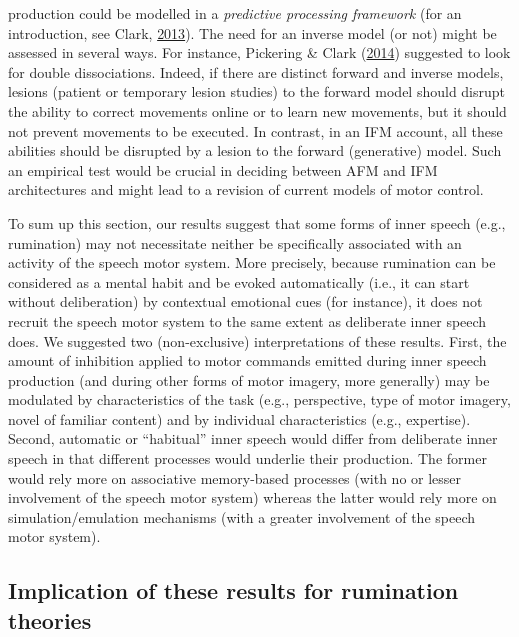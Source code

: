 \documentclass[a4paper,12pt,twoside,onecolumn,openright,final,oldfontcommands]{memoir}
\begin{document}
production could be modelled in a \emph{predictive processing framework} (for an introduction, see Clark, \protect\hyperlink{ref-clark_whatever_2013}{2013}). The need for an inverse model (or not) might be assessed in several ways. For instance, Pickering \& Clark (\protect\hyperlink{ref-pickering_getting_2014}{2014}) suggested to look for double dissociations. Indeed, if there are distinct forward and inverse models, lesions (patient or temporary lesion studies) to the forward model should disrupt the ability to correct movements online or to learn new movements, but it should not prevent movements to be executed. In contrast, in an IFM account, all these abilities should be disrupted by a lesion to the forward (generative) model. Such an empirical test would be crucial in deciding between AFM and IFM architectures and might lead to a revision of current models of motor control.

To sum up this section, our results suggest that some forms of inner speech (e.g., rumination) may not necessitate neither be specifically associated with an activity of the speech motor system. More precisely, because rumination can be considered as a mental habit and be evoked automatically (i.e., it can start without deliberation) by contextual emotional cues (for instance), it does not recruit the speech motor system to the same extent as deliberate inner speech does. We suggested two (non-exclusive) interpretations of these results. First, the amount of inhibition applied to motor commands emitted during inner speech production (and during other forms of motor imagery, more generally) may be modulated by characteristics of the task (e.g., perspective, type of motor imagery, novel of familiar content) and by individual characteristics (e.g., expertise). Second, automatic or \enquote{habitual} inner speech would differ from deliberate inner speech in that different processes would underlie their production. The former would rely more on associative memory-based processes (with no or lesser involvement of the speech motor system) whereas the latter would rely more on simulation/emulation mechanisms (with a greater involvement of the speech motor system).

\hypertarget{implication-of-these-results-for-rumination-theories}{%
\subsection{Implication of these results for rumination theories}\label{implication-of-these-results-for-rumination-theories}}
\end{document}

